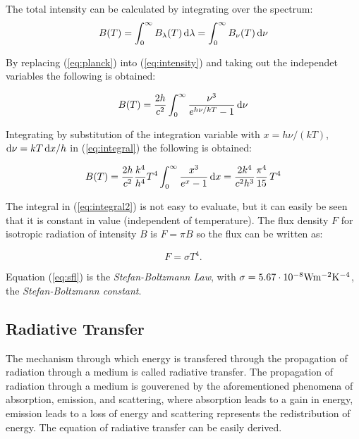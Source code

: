 The total intensity can be calculated by integrating over the spectrum:
\begin{equation}\label{eq:intensity}
	B(T) 
	=\int_{0}^{\infty} B_\lambda(T) \mathop{}\!\mathrm{d} \lambda
	=\int_{0}^{\infty} B_\nu(T) \mathop{}\!\mathrm{d} \nu 
\end{equation}

By replacing (\ref{eq:planck}) into (\ref{eq:intensity}) and taking out the independet variables the following is obtained:

\begin{equation}\label{eq:integral}
	B(T) 
	=\frac{2h}{c^2} \int_{0}^{\infty} \frac{\nu^3}{e^{h\nu/kT}-1} \mathop{}\!\mathrm{d} \nu 
\end{equation}

Integrating by substitution of the integration variable with $x = h\nu/(kT)$, $\mathop{}\!\mathrm{d} \nu =kT \mathop{}\!\mathrm{d} x/h$  in (\ref{eq:integral}) the following is obtained:

\begin{equation}\label{eq:integral2}
	B(T) 
	=\frac{2h}{c^2}\frac{k^4}{h^4} T^4 \int_{0}^{\infty} \frac{x^3}{e^{x}-1} \mathop{}\!\mathrm{d} x
	=\frac{2k^4}{c^2h^3}\frac{\pi^4}{15} \, T^4 
\end{equation}

The integral in (\ref{eq:integral2}) is not easy to evaluate, but it can easily be seen that it is constant in value (independent of temperature). The flux density $F$ for isotropic radiation of intensity $B$ is $F=\pi B$ so the flux can be written as:

\begin{equation}\label{eq:sfl}
	F
	=\sigma T^4. 
\end{equation}

Equation (\ref{eq:sfl}) is the \textit{Stefan-Boltzmann Law}, with $\sigma = 5.67 \cdot 10^{-8}\rm{W m^{-2} K^{-4}}$, the \textit{Stefan-Boltzmann constant}. 

\subsection{Radiative Transfer} %

The mechanism through which energy is transfered through the propagation of radiation through a medium is called radiative transfer. The propagation of radiation through a medium is gouverened by the aforementioned phenomena of absorption, emission, and scattering, where absorption leads to a gain in energy, emission leads to a loss of energy and scattering represents the redistribution of energy. The equation of radiative transfer can be easily derived. 


